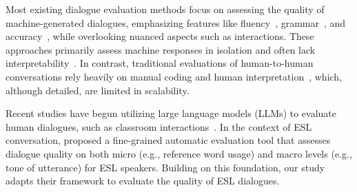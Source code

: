 Most existing dialogue evaluation methods focus on assessing the quality of machine-generated dialogues, emphasizing features like fluency~\cite{ou-etal-2024-dialogbench}, grammar~\citep{lin2023llm}, and  accuracy~\citep{han2022measuring,chen2023automatic}, while overlooking nuanced aspects such as interactions. These approaches primarily assess machine responses in isolation and often lack interpretability~\citep{smith2022human}. In contrast, traditional evaluations of human-to-human conversations rely heavily on manual coding and human interpretation~\citep{o2018use,mckenzie2000hope}, which, although detailed, are limited in scalability.

Recent studies have begun utilizing large language models (LLMs) to evaluate human dialogues, such as classroom interactions~\citep{long2024evaluating}. In the context of ESL conversation, \citet{gao2024cnima} proposed a fine-grained automatic evaluation tool that assesses dialogue quality on both micro (e.g., reference word usage) and macro levels (e.g., tone of utterance) for ESL speakers. Building on this foundation, our study adapts their framework to evaluate the quality of ESL dialogues. %




